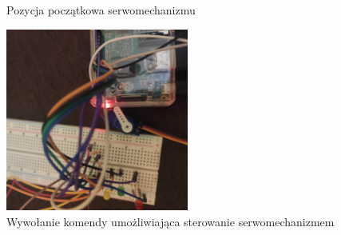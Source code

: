\begin{itemize}
\begin{figure}[htbp]
	\caption{Pozycja początkowa serwomechanizmu}
	\label{fig:55}
\end{figure}
\begin{figure}[htbp]
	\centering
	\includegraphics[width=0.4\linewidth, height=6cm]{"obrazy/servo2.jpg"}
	\caption{Wywołanie komendy umożliwiająca sterowanie serwomechanizmem }
	\label{fig:56}
\end{figure}
\\
\end{itemize}









